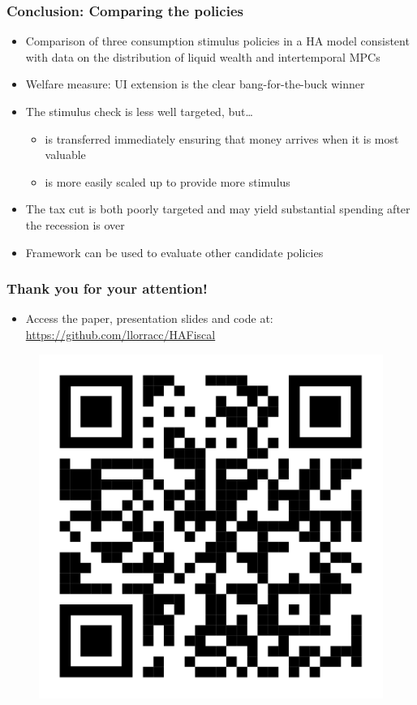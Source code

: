 \documentclass[pdflatex,aspectratio=169]{beamer}
\begin{document}
\begin{frame}
	\frametitle{Conclusion: Comparing the policies}
	\begin{itemize}[<+->]
		\itemsep = .5\bigskipamount 
		\item Comparison of three consumption stimulus policies in a HA model consistent with data on the distribution of liquid wealth and intertemporal MPCs 
		\item Welfare measure: UI extension is the clear bang-for-the-buck winner 
		\item The stimulus check is less well targeted, but\ldots 
		\begin{itemize}[<+->]
			\itemsep = .25\bigskipamount 
			\item is transferred immediately ensuring that money arrives when it is most valuable 
			\item is more easily scaled up to provide more stimulus 
		\end{itemize}
		\item The tax cut is both poorly targeted and may yield substantial spending after the recession is over 
		\item Framework can be used to evaluate other candidate policies 
		
	\end{itemize}
	
\end{frame}



\begin{frame}
	\frametitle{Thank you for your attention!}
	\begin{itemize}[<+->] 
		\item Access the paper, presentation slides and code at: \href{https://github.com/llorracc/HAFiscal}{https://github.com/llorracc/HAFiscal}
	\end{itemize}	

		\begin{figure}
			\centering
			\includegraphics[width=0.3\linewidth]{HAFiscal-Slides-qr-code}
		\end{figure}
	
\end{frame}
\end{document}
